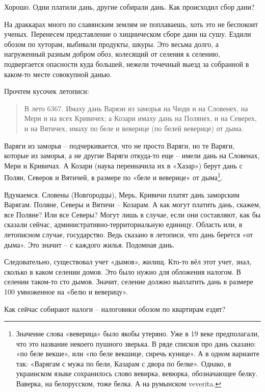 Хорошо. Одни платили дань, другие собирали дань. Как происходил сбор дани?

На драккарах много по славянским землям не поплаваешь, хоть это не беспокоит ученых. Перенесем представление о хищническом сборе дани на сушу. Ездили обозом по хуторам, выбивали продукты, шкуры. Это весьма долго, а нагруженный разным добром обоз, колесящий от селения к селению, подвергается опасности куда большей, нежели точечный выезд за собранной в каком-то месте совокупной данью. 

Прочтем кусочек летописи:

\begin{quotation}
В лето 6367. Имаху дань Варязи из заморья на Чюди и на Словенех, на Мери и на всех Кривичех; а Козари имаху дань на Полянех, и на Северех, и на Вятичех, имаху по беле и веверице (по белей веверице) от дыма.
\end{quotation}

Варяги из заморья – подчеркивается, что не просто Варяги, но те Варяги, которые из заморья, а не другие Варяги откуда-то еще – имели дань на Словенах, Мери и Кривичах. А Козари (наука переиначила их в «Хазар») берут дань с Полян, Северов и Вятичей, в размере по «беле и веверице» от дыма\footnote{Значение слова «веверица» было якобы утеряно. Уже в 19 веке предполагали, что это название некоего пушного зверька. В ряде списков про дань сказано: «по беле векше», или «по беле векшице, сиречь кунице». А в одном варианте так: «Варягам с мужа по бели, Казарам с двора по белке». Однако, в украинском языке сохранилось слово вевирка, вевюрка, обозначающее белку. Ваверка, на белорусском, тоже белка. А на румынском veverita.}.

Вдумаемся. Словены (Новгородцы), Мерь, Кривичи платят дань заморским Варягам. Поляне, Северы и Вятичи – Козарам. А как могут платить дань, скажем, все Поляне? Или все Северы? Могут лишь в случае, если они составляют, как бы сказали сейчас, административно-территориальную единицу. Область или, в летописном случае, государство. Ведь сказано в летописи, что дань берется «от дыма». Это значит – с каждого жилья. Подомная дань.

Следовательно, существовал учет «дымов», жилищ. Кто-то вёл этот учет, знал, сколько в каком селении домов. Это было нужно для обложения налогом. В селении таком-то сто дымов. Значит, селение должно выплатить дань в размере 100 умноженное на «белю и веверицу».

Как сейчас собирают налоги – налоговики обозом по квартирам ездят?

